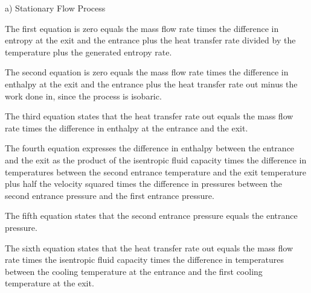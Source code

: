 a) Stationary Flow Process

The first equation is zero equals the mass flow rate times the difference in entropy at the exit and the entrance plus the heat transfer rate divided by the temperature plus the generated entropy rate.

The second equation is zero equals the mass flow rate times the difference in enthalpy at the exit and the entrance plus the heat transfer rate out minus the work done in, since the process is isobaric.

The third equation states that the heat transfer rate out equals the mass flow rate times the difference in enthalpy at the entrance and the exit.

The fourth equation expresses the difference in enthalpy between the entrance and the exit as the product of the isentropic fluid capacity times the difference in temperatures between the second entrance temperature and the exit temperature plus half the velocity squared times the difference in pressures between the second entrance pressure and the first entrance pressure.

The fifth equation states that the second entrance pressure equals the entrance pressure.

The sixth equation states that the heat transfer rate out equals the mass flow rate times the isentropic fluid capacity times the difference in temperatures between the cooling temperature at the entrance and the first cooling temperature at the exit.